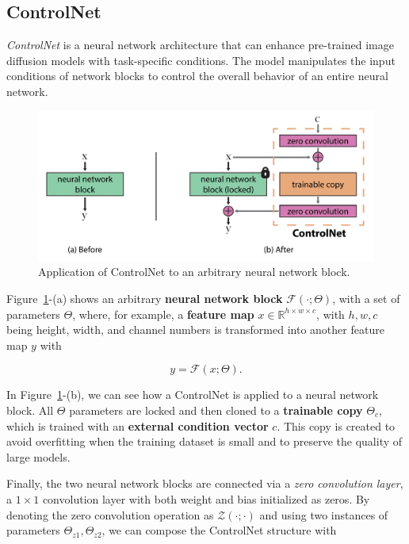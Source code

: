 \documentclass[preprint]{elsarticle}
\begin{document}
\subsection{ControlNet}

\emph{ControlNet} \cite{zhang2023adding} is a neural network architecture that can enhance  pre-trained image diffusion models with task-specific conditions.  The model manipulates the input conditions of network blocks to control the overall behavior of an entire neural network.

\begin{figure}[b]
	\centering
    \includegraphics[scale=0.8]{img/svg/Controlnet1.png}
	\caption{Application of ControlNet to an arbitrary neural network block.}\label{fig:controlnet}
\end{figure}


Figure~\ref{fig:controlnet}-(a) shows an arbitrary \textbf{neural network block} $\mathcal{F}(\cdot;\Theta)$,  with a set of parameters $\Theta$, where, for example, a \textbf{feature map} $x \in \mathbb{R}^{h\times w \times c}$, with ${h,w,c}$  being height, width, and channel numbers is transformed into another feature map $y$ with

\begin{equation}
	y = \mathcal{F}(x;\Theta).
\end{equation}

In Figure~\ref{fig:controlnet}-(b), we can see how a ControlNet is applied to a neural network block.
All $\Theta$ parameters are locked and then cloned to a \textbf{trainable copy} $\Theta_c$, 
which is trained with an \textbf{external condition vector} $c$.  This copy is created to avoid overfitting when the training dataset is small  and to preserve the quality of large models. 

Finally, the two neural network blocks are connected via a \emph{zero convolution layer},  a $1\times1$ convolution layer with both weight and bias initialized as zeros. By denoting the zero convolution operation as $\mathcal{Z}(\cdot;\cdot)$ and using two instances of parameters ${\Theta_{z1},\Theta_{z2}}$, we can compose the ControlNet structure with
\end{document}
